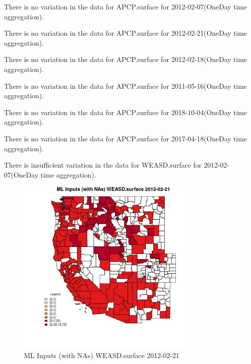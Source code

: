 There is no variation in the data for APCP.surface for 2012-02-07(OneDay time aggregation). 
 

There is no variation in the data for APCP.surface for 2012-02-21(OneDay time aggregation). 
 

There is no variation in the data for APCP.surface for 2012-02-18(OneDay time aggregation). 
 

There is no variation in the data for APCP.surface for 2011-05-16(OneDay time aggregation). 
 

There is no variation in the data for APCP.surface for 2018-10-04(OneDay time aggregation). 
 

There is no variation in the data for APCP.surface for 2017-04-18(OneDay time aggregation). 
 

There is insufficient variation in the data for WEASD.surface for 2012-02-07(OneDay time aggregation). 
 

\begin{figure} 
\centering  
\includegraphics[width=0.77\textwidth]{Code_Outputs/Report_ML_input_PM25_Step4_part_f_de_duplicated_aves_prioritize_24hr_obswNAs_CountyWEASDsurfaceMean2012-02-21.jpg} 
\caption{\label{fig:Report_ML_input_PM25_Step4_part_f_de_duplicated_aves_prioritize_24hr_obswNAsCountyWEASDsurfaceMean2012-02-21}ML Inputs (with NAs) WEASD.surface 2012-02-21} 
\end{figure} 
 

